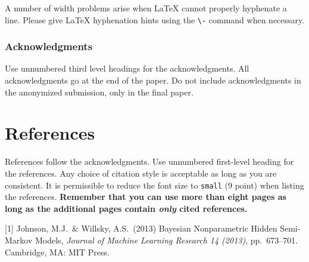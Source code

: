 \documentclass{article}
\begin{document}
A number of width problems arise when \LaTeX{} cannot properly hyphenate a
line. Please give LaTeX hyphenation hints using the \verb+\-+ command when
necessary.

\subsubsection*{Acknowledgments}

Use unnumbered third level headings for the acknowledgments. All acknowledgments
go at the end of the paper. Do not include acknowledgments in the anonymized
submission, only in the final paper.

\section*{References}

References follow the acknowledgments. Use unnumbered first-level heading for
the references. Any choice of citation style is acceptable as long as you are
consistent. It is permissible to reduce the font size to \verb+small+ (9 point)
when listing the references. {\bf Remember that you can use more than eight
  pages as long as the additional pages contain \emph{only} cited references.}
\medskip

\small

[1] Johnson, M.J.\ \& Willsky, A.S.\ (2013) Bayesian Nonparametric Hidden Semi-Markov Models, {\it Journal of Machine Learning Research 14 (2013)},
pp.\ 673--701. Cambridge, MA: MIT Press.
\end{document}
